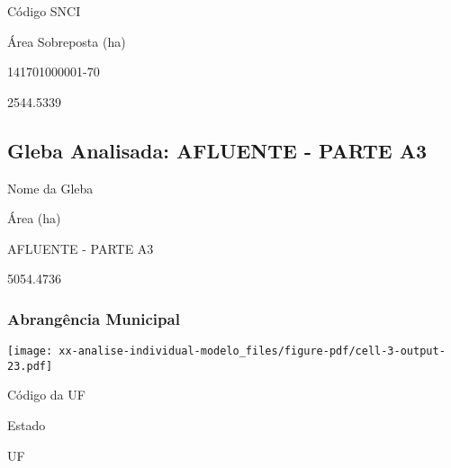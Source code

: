 \documentclass[
  11pt,
  a4paper,
  DIV=11,
  numbers=noendperiod]{scrartcl}
\begin{document}
Código SNCI

\n      

Área Sobreposta (ha)

\n    

\n  

\n  

\n    

\n      

141701000001-70

\n      

2544.5339

\n    

\n  

\n

\subsection{Gleba Analisada: AFLUENTE - PARTE
A3}\label{gleba-analisada-afluente---parte-a3}

\n  

\n    

\n      

Nome da Gleba

\n      

Área (ha)

\n    

\n  

\n  

\n    

\n      

AFLUENTE - PARTE A3

\n      

5054.4736

\n    

\n  

\n

\subsubsection{Abrangência Municipal}\label{abranguxeancia-municipal-1}

\texttt{[image: xx-analise-individual-modelo\_files/figure-pdf/cell-3-output-23.pdf]}

\n  

\n    

\n      

Código da UF

\n      

Estado

\n      

UF
\end{document}
